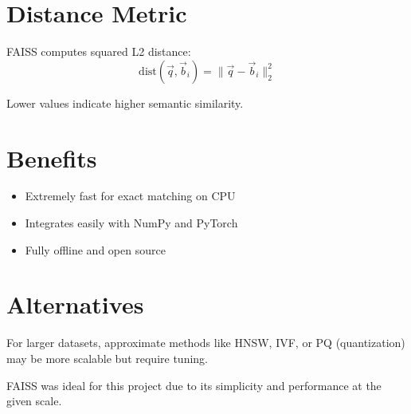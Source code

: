 \section*{Distance Metric}
FAISS computes squared L2 distance:
\[ \text{dist}(\vec{q}, \vec{b}_i) = \| \vec{q} - \vec{b}_i \|_2^2 \]

Lower values indicate higher semantic similarity.

\section*{Benefits}
\begin{itemize}
  \item Extremely fast for exact matching on CPU
  \item Integrates easily with NumPy and PyTorch
  \item Fully offline and open source
\end{itemize}

\section*{Alternatives}
For larger datasets, approximate methods like HNSW, IVF, or PQ (quantization) may be more scalable but require tuning.

FAISS was ideal for this project due to its simplicity and performance at the given scale.